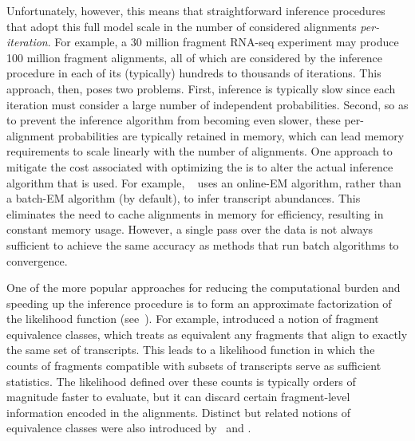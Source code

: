 Unfortunately, however, this means that straightforward inference procedures that adopt 
this full model scale in the number of considered alignments \emph{per-iteration}.  
For example, a 30 million fragment RNA-seq experiment may produce 100 million fragment 
alignments, all of which are considered by the inference procedure in each of its 
(typically) hundreds to thousands of iterations.  This approach, then, poses two 
problems.  First, inference is typically slow since each iteration must consider 
a large number of independent probabilities.  Second, so as to prevent the inference 
algorithm from becoming even slower, these per-alignment probabilities are typically 
retained in memory, which can lead memory requirements to scale linearly with the 
number of alignments. One approach to mitigate the cost associated with optimizing 
the \fm is to alter the actual inference algorithm that is used.  For example, 
\express~\citep{Roberts2013Express} uses an online-EM algorithm, rather than 
a batch-EM algorithm (by default), to infer transcript abundances.  This eliminates 
the need to cache alignments in memory for efficiency, resulting in constant memory 
usage. However, a single pass over the data is not always sufficient to achieve the 
same accuracy as methods that run batch algorithms to convergence.

One of the more popular approaches for reducing the computational burden and speeding 
up the inference procedure is to form an approximate factorization of the likelihood 
function (see~). For example, \mmseq introduced a notion of 
fragment equivalence classes, which treats as equivalent any fragments that align 
to exactly the same set of transcripts.  This leads to a likelihood function in which 
the counts of fragments compatible with subsets of transcripts serve as sufficient 
statistics. The likelihood defined over these counts is typically orders of magnitude 
faster to evaluate, but it can discard certain fragment-level information encoded in 
the alignments. Distinct but related notions of equivalence classes were also 
introduced by~\citet{salzman2011statistical} and \citet{Nicolae2011Estimation}.

